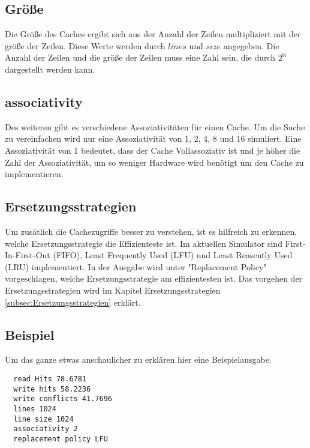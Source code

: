 \documentclass{scrreprt}
\begin{document}
\subsection{Größe}

Die Größe des Caches ergibt sich aus der Anzahl der Zeilen multipliziert mit der größe der Zeilen. Diese Werte werden durch \(lines\) und \(size\) angegeben. Die Anzahl der Zeilen und die größe der Zeilen muss eine Zahl sein, die durch \( 2^\mathbb{N} \) dargestellt werden kann.

\subsection{associativity}

Des weiteren gibt es verschiedene Assoziativitäten für einen Cache. Um die Suche zu vereinfachen wird nur eine Assoziativität von 1, 2, 4, 8 und 16 simuliert. Eine Assoziativität von 1 bedeutet, dass der Cache Vollassoziativ ist und je höher die Zahl der Assoziativität, um so weniger Hardware wird benötigt um den Cache zu implementieren.

\subsection{Ersetzungsstrategien}

Um zusätlich die Cachezugriffe besser zu verstehen, ist es hilfreich zu erkennen, welche Ersetzungsstrategie die Effizienteste ist. Im aktuellen Simulator sind First-In-First-Out (FIFO), Least Frequently Used (LFU) und Least Reasently Used (LRU) implementiert. In der Ausgabe wird unter "Replacement Policy" vorgeschlagen, welche Ersetzungsstrategie am effizientesten ist. Das vorgehen der Ersetzungsstrategien wird im Kapitel Ersetzungsstrategien \ref{subsec:Ersetzungsstrategien} erklärt.

\subsection{Beispiel}

Um das ganze etwas anschaulicher zu erklären hier eine Beispielausgabe.

\begin{lstlisting}
  read Hits 78.6781
  write hits 58.2236
  write conflicts 41.7696
  lines 1024
  line size 1024
  associativity 2
  replacement policy LFU
\end{lstlisting}
\end{document}
